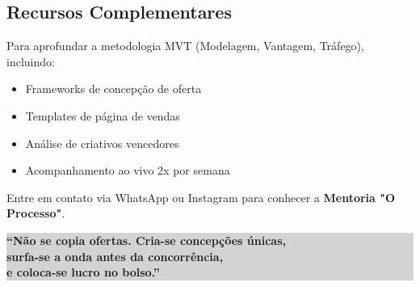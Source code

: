 \documentclass[12pt, a4paper]{article}
\begin{document}
\subsection{Recursos Complementares}

Para aprofundar a metodologia MVT (Modelagem, Vantagem, Tráfego), incluindo:
\begin{itemize}
    \item Frameworks de concepção de oferta
    \item Templates de página de vendas
    \item Análise de criativos vencedores
    \item Acompanhamento ao vivo 2x por semana
\end{itemize}

Entre em contato via WhatsApp ou Instagram para conhecer a \textbf{Mentoria "O Processo"}.

\vspace{0.5cm}

\begin{center}
\colorbox{lightGray}{%
    \parbox{0.85\textwidth}{%
        \centering
        \vspace{0.3cm}
        \textcolor{primaryColor}{\textbf{``Não se copia ofertas. Cria-se concepções únicas,}}\\
        \textcolor{primaryColor}{\textbf{surfa-se a onda antes da concorrência,}}\\
        \textcolor{primaryColor}{\textbf{e coloca-se lucro no bolso.''}}\\
        \vspace{0.3cm}
    }%
}
\end{center}
\pagebreak

\thispagestyle{empty}
\vspace*{0.5cm}
\end{document}
